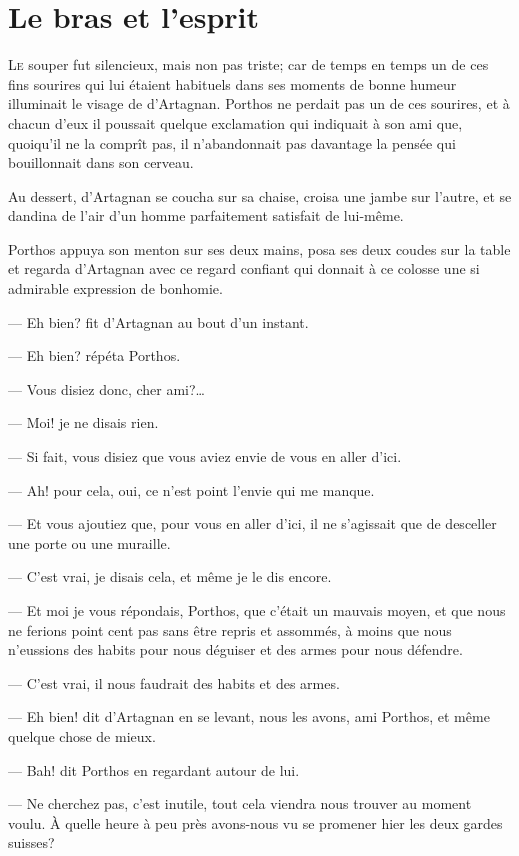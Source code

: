 \chapter{Le bras et l'esprit}

\lettrine{L}{e} souper fut silencieux, mais non pas triste; car de temps en temps un de ces fins sourires qui lui étaient habituels dans ses moments de bonne humeur illuminait le visage de d'Artagnan. Porthos ne perdait pas un de ces sourires, et à chacun d'eux il poussait quelque exclamation qui indiquait à son ami que, quoiqu'il ne la comprît pas, il n'abandonnait pas davantage la pensée qui bouillonnait dans son cerveau.

Au dessert, d'Artagnan se coucha sur sa chaise, croisa une jambe sur l'autre, et se dandina de l'air d'un homme parfaitement satisfait de lui-même.

Porthos appuya son menton sur ses deux mains, posa ses deux coudes sur la table et regarda d'Artagnan avec ce regard confiant qui donnait à ce colosse une si admirable expression de bonhomie.

— Eh bien? fit d'Artagnan au bout d'un instant.

— Eh bien? répéta Porthos.

— Vous disiez donc, cher ami?\dots

— Moi! je ne disais rien.

— Si fait, vous disiez que vous aviez envie de vous en aller d'ici.

— Ah! pour cela, oui, ce n'est point l'envie qui me manque.

— Et vous ajoutiez que, pour vous en aller d'ici, il ne s'agissait que de desceller une porte ou une muraille.

— C'est vrai, je disais cela, et même je le dis encore.

— Et moi je vous répondais, Porthos, que c'était un mauvais moyen, et que nous ne ferions point cent pas sans être repris et assommés, à moins que nous n'eussions des habits pour nous déguiser et des armes pour nous défendre.

— C'est vrai, il nous faudrait des habits et des armes.

— Eh bien! dit d'Artagnan en se levant, nous les avons, ami Porthos, et même quelque chose de mieux.

— Bah! dit Porthos en regardant autour de lui.

— Ne cherchez pas, c'est inutile, tout cela viendra nous trouver au moment voulu. À quelle heure à peu près avons-nous vu se promener hier les deux gardes suisses?

